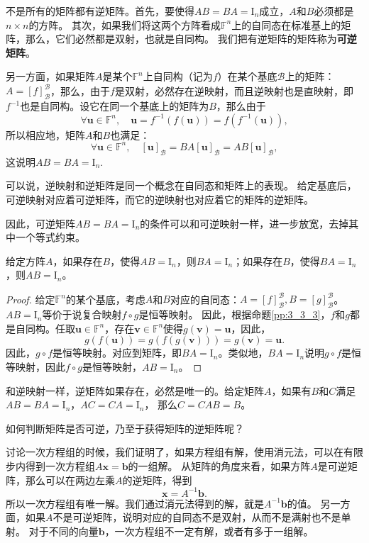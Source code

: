 \documentclass[12pt,UTF8]{ctexbook}
\begin{document}
不是所有的矩阵都有逆矩阵。首先，要使得$AB=BA=\mathrm{I}_n$成立，$A$和$B$必须都是$n\times n$的方阵。
其次，如果我们将这两个方阵看成$\mathbb{F}^n$上的自同态在标准基上的矩阵，那么，它们必然都是双射，也就是自同构。
我们把有逆矩阵的矩阵称为\textbf{可逆矩阵}。

另一方面，如果矩阵$A$是某个$\mathbb{F}^n$上自同构（记为$f$）在某个基底$\mathcal{B}$上的矩阵：$A = [f]_{\mathcal{B}}^{\mathcal{B}}$，那么，由于$f$是双射，必然存在逆映射，而且逆映射也是直映射，即$f^{-1}$也是自同构。设它在同一个基底上的矩阵为$B$，那么由于
$$\forall \mathbf{u} \in \mathbb{F}^n, \quad \mathbf{u} = f^{-1}(f(\mathbf{u})) = f(f^{-1}(\mathbf{u})),$$
所以相应地，矩阵$A$和$B$也满足：
$$\forall \mathbf{u} \in \mathbb{F}^n, \quad [\mathbf{u}]_{\mathcal{B}} = BA[\mathbf{u}]_{\mathcal{B}} = AB[\mathbf{u}]_{\mathcal{B}},$$
这说明$AB=BA=\mathrm{I}_n.$

可以说，逆映射和逆矩阵是同一个概念在自同态和矩阵上的表现。
给定基底后，可逆映射对应着可逆矩阵，而它的逆映射也对应着它的矩阵的逆矩阵。

因此，可逆矩阵$AB=BA=\mathrm{I}_n$的条件可以和可逆映射一样，进一步放宽，去掉其中一个等式约束。

\begin{pp}\label{pp:5_1}
    给定方阵$A$，如果存在$B$，使得$AB = \mathrm{I}_n$，则$BA = \mathrm{I}_n$；如果存在$B$，使得$BA = \mathrm{I}_n$，则$AB = \mathrm{I}_n$。
\end{pp}
\begin{proof} %
给定$\mathbb{F}^n$的某个基底，考虑$A$和$B$对应的自同态：$A = [f]_{\mathcal{B}}^{\mathcal{B}}, B = [g]_{\mathcal{B}}^{\mathcal{B}}$。
$AB = \mathrm{I}_n$等价于说复合映射$f\circ g$是恒等映射。
因此，根据命题\ref{pp:3_3_3}，$f$和$g$都是自同构。任取$\mathbf{u} \in \mathbb{F}^n$，存在$\mathbf{v} \in \mathbb{F}^n$使得$g(\mathbf{v}) = \mathbf{u}$，因此，
$$g(f(\mathbf{u})) = g(f(g(\mathbf{v}))) = g(\mathbf{v}) = \mathbf{u}.$$
因此，$g\circ f$是恒等映射。对应到矩阵，即$BA = \mathrm{I}_n$。类似地，$BA = \mathrm{I}_n$说明$g\circ f$是恒等映射，因此$f\circ g$是恒等映射，$AB = \mathrm{I}_n$。
\end{proof}


和逆映射一样，逆矩阵如果存在，必然是唯一的。给定矩阵$A$，如果有$B$和$C$满足$AB=BA=\mathrm{I}_n$，$AC=CA=\mathrm{I}_n$，
那么$C = CAB = B$。

如何判断矩阵是否可逆，乃至于获得矩阵的逆矩阵呢？

讨论一次方程组的时候，我们证明了，如果方程组有解，使用消元法，可以在有限步内得到一次方程组$ A\mathbf{x} = \mathbf{b}$的一组解。
从矩阵的角度来看，如果方阵$A$是可逆矩阵，那么可以在两边左乘$A$的逆矩阵，得到
$$ \mathbf{x} = A^{-1}\mathbf{b}.$$
所以一次方程组有唯一解。我们通过消元法得到的解，就是$A^{-1}\mathbf{b}$的值。
另一方面，如果$A$不是可逆矩阵，说明对应的自同态不是双射，从而不是满射也不是单射。
对于不同的向量$\mathbf{b}$，一次方程组不一定有解，或者有多于一组解。
\end{document}
